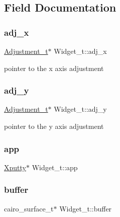 \subsection{Field Documentation}
\mbox{\label{structWidget__t_aabc05e0a46c85d24483fae36127b45dd}} 
\subsubsection{\texorpdfstring{adj\+\_\+x}{adj\_x}}
{\footnotesize\ttfamily \hyperlink{structAdjustment__t}{Adjustment\+\_\+t}$\ast$ Widget\+\_\+t\+::adj\+\_\+x}

pointer to the x axis adjustment \mbox{\label{structWidget__t_abde95d3fb49faff5dd852f16810115e7}} 
\subsubsection{\texorpdfstring{adj\+\_\+y}{adj\_y}}
{\footnotesize\ttfamily \hyperlink{structAdjustment__t}{Adjustment\+\_\+t}$\ast$ Widget\+\_\+t\+::adj\+\_\+y}

pointer to the y axis adjustment \mbox{\label{structWidget__t_a06eaa5b134c47983fd965e745cdbaa3b}} 
\subsubsection{\texorpdfstring{app}{app}}
{\footnotesize\ttfamily \hyperlink{structXputty}{Xputty}$\ast$ Widget\+\_\+t\+::app}

\mbox{\label{structWidget__t_a84d225e7b261d67daa764b47c8c62107}} 
\subsubsection{\texorpdfstring{buffer}{buffer}}
{\footnotesize\ttfamily cairo\+\_\+surface\+\_\+t$\ast$ Widget\+\_\+t\+::buffer}

